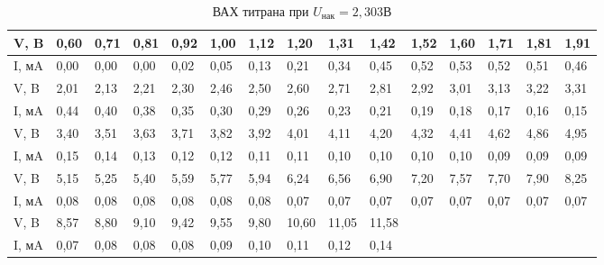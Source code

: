 \documentclass[a4paper]{article}
\begin{document}
\begin{enumerate}
    \begin{table}[H]
      \begin{tabular}{|l|l|l|l|l|l|l|l|l|l|l|l|l|l|l|}
    \hline
      V, B  & 0,60 & 0,71 & 0,81 & 0,92 & 1,00 & 1,12 & 1,20  & 1,31  & 1,42  & 1,52 & 1,60 & 1,71 & 1,81 & 1,91 \\ \hline
    I, мA & 0,00                         & 0,00                         & 0,00 & 0,02 & 0,05 & 0,13 & 0,21  & 0,34  & 0,45  & 0,52 & 0,53 & 0,52 & 0,51 & 0,46 \\ \hline
    V, B  & 2,01                         & 2,13                         & 2,21 & 2,30 & 2,46 & 2,50 & 2,60  & 2,71  & 2,81  & 2,92 & 3,01 & 3,13 & 3,22 & 3,31 \\ \hline
    I, мA & 0,44                         & 0,40                         & 0,38 & 0,35 & 0,30 & 0,29 & 0,26  & 0,23  & 0,21  & 0,19 & 0,18 & 0,17 & 0,16 & 0,15 \\ \hline
    V, B  & 3,40                         & 3,51                         & 3,63 & 3,71 & 3,82 & 3,92 & 4,01  & 4,11  & 4,20  & 4,32 & 4,41 & 4,62 & 4,86 & 4,95 \\ \hline
    I, мA & 0,15                         & 0,14                         & 0,13 & 0,12 & 0,12 & 0,11 & 0,11  & 0,10  & 0,10  & 0,10 & 0,10 & 0,09 & 0,09 & 0,09 \\ \hline
    V, B  & 5,15                         & 5,25                         & 5,40 & 5,59 & 5,77 & 5,94 & 6,24  & 6,56  & 6,90  & 7,20 & 7,57 & 7,70 & 7,90 & 8,25 \\ \hline
    I, мA & 0,08                         & 0,08                         & 0,08 & 0,08 & 0,08 & 0,08 & 0,07  & 0,07  & 0,07  & 0,07 & 0,07 & 0,07 & 0,07 & 0,07 \\ \hline
    V, B  & 8,57                         & 8,80                         & 9,10 & 9,42 & 9,55 & 9,80 & 10,60 & 11,05 & 11,58 &      &      &      &      &      \\ \hline
    I, мA & 0,07                         & 0,08                         & 0,08 & 0,08 & 0,09 & 0,10 & 0,11  & 0,12  & 0,14  &      &      &      &      &     \\ \hline
      \end{tabular}
      \caption{ВАХ титрана при $U_{нак} = 2,303 В$}
      \end{table}


\end{enumerate}
\end{document}
